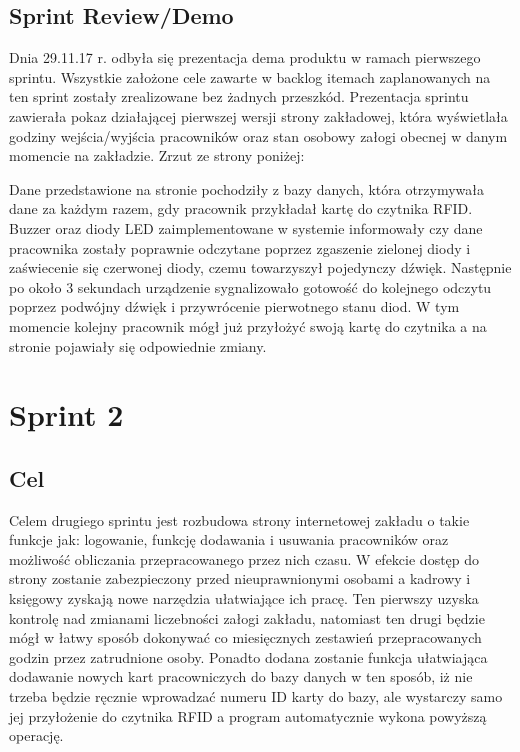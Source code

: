 \documentclass[a4paper]{article}
\begin{document}
\subsection{Sprint Review/Demo}

Dnia 29.11.17 r. odbyła się prezentacja dema produktu w ramach pierwszego sprintu. Wszystkie założone cele zawarte w backlog itemach zaplanowanych na ten sprint zostały zrealizowane bez żadnych przeszkód. Prezentacja sprintu zawierała pokaz działającej pierwszej wersji strony zakładowej, która wyświetlała godziny wejścia/wyjścia pracowników oraz stan osobowy załogi obecnej w danym momencie na zakładzie.    
Zrzut ze strony poniżej:
\begin{figure}[!htbp]
\end{figure}

Dane przedstawione na stronie pochodziły z bazy danych, która otrzymywała dane za każdym razem, gdy pracownik przykładał kartę do czytnika RFID. Buzzer oraz diody LED  zaimplementowane w systemie informowały czy dane pracownika zostały poprawnie odczytane  poprzez zgaszenie  zielonej diody i zaświecenie się czerwonej diody, czemu towarzyszył pojedynczy dźwięk. Następnie po około 3 sekundach urządzenie sygnalizowało gotowość do kolejnego odczytu poprzez podwójny dźwięk i przywrócenie pierwotnego stanu diod. W tym momencie kolejny pracownik mógł już przyłożyć swoją kartę do czytnika a na stronie pojawiały się odpowiednie zmiany.

\section{Sprint 2}

\subsection{Cel} Celem drugiego sprintu jest rozbudowa strony internetowej zakładu o takie funkcje jak: logowanie, funkcję dodawania i usuwania pracowników oraz możliwość obliczania przepracowanego przez nich czasu. W efekcie dostęp do strony zostanie zabezpieczony przed nieuprawnionymi osobami a kadrowy i księgowy zyskają nowe narzędzia ułatwiające ich pracę. Ten pierwszy uzyska kontrolę nad zmianami liczebności załogi zakładu, natomiast ten drugi będzie mógł w łatwy sposób dokonywać co miesięcznych zestawień przepracowanych godzin przez zatrudnione osoby. Ponadto dodana zostanie funkcja ułatwiająca dodawanie nowych kart pracowniczych do bazy danych w ten sposób, iż nie trzeba będzie ręcznie wprowadzać numeru ID karty do bazy, ale wystarczy samo jej przyłożenie do czytnika RFID a program automatycznie wykona powyższą operację.
\end{document}
